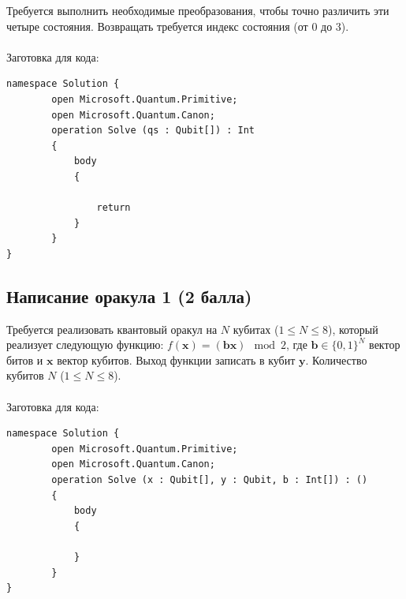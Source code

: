 \documentclass{article}
\begin{document}
Требуется выполнить необходимые преобразования, чтобы точно различить эти четыре состояния. Возвращать требуется индекс состояния (от $0$ до $3$). 
\\\\
Заготовка для кода:
\begin{lstlisting}
namespace Solution {
        open Microsoft.Quantum.Primitive;
        open Microsoft.Quantum.Canon;
        operation Solve (qs : Qubit[]) : Int
        {
            body
            {

                return 
            }
        }
}
\end{lstlisting}


\subsection{Написание оракула 1 (2 балла)}

Требуется реализовать квантовый оракул на $N$ кубитах ($1 \le N \le 8$), который реализует следующую функцию: $f(\pmb{x}) = (\pmb{b}\pmb{x}) \mod 2$, где  $\pmb{b} \in \{0,1\}^N$ вектор битов и  $\pmb{x}$ вектор кубитов. Выход функции записать в кубит $\pmb{y}$. Количество кубитов $N$ ($1 \le N \le 8$). 
\\\\
Заготовка для кода:
\begin{lstlisting}
namespace Solution {
        open Microsoft.Quantum.Primitive;
        open Microsoft.Quantum.Canon;
        operation Solve (x : Qubit[], y : Qubit, b : Int[]) : ()
        {
            body
            {

            }
        }
}
\end{lstlisting}
\end{document}
